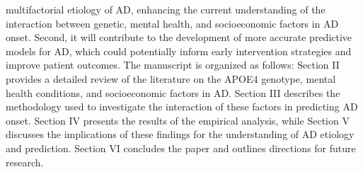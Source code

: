 \documentclass[conference]{IEEEtran}
\begin{document}
multifactorial etiology of AD, enhancing the current understanding of the interaction between genetic, mental health, and socioeconomic factors in AD onset. Second, it will contribute to the development of more accurate predictive models for AD, which could potentially inform early intervention strategies and improve patient outcomes. The manuscript is organized as follows: Section II provides a detailed review of the literature on the APOE4 genotype, mental health conditions, and socioeconomic factors in AD. Section III describes the methodology used to investigate the interaction of these factors in predicting AD onset. Section IV presents the results of the empirical analysis, while Section V discusses the implications of these findings for the understanding of AD etiology and prediction. Section VI concludes the paper and outlines directions for future research.
\end{document}
